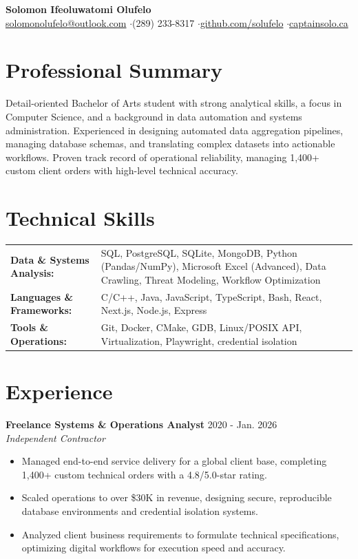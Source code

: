 \documentclass[a4paper,10pt]{article}
\begin{document}
\begin{center}
    {\LARGE \textbf{Solomon Ifeoluwatomi Olufelo}} \\[2pt]
    \href{mailto:solomonolufelo@outlook.com}{solomonolufelo@outlook.com} \enspace$\cdot$\enspace (289) 233-8317 \enspace$\cdot$\enspace \href{https://github.com/solufelo}{github.com/solufelo} \enspace$\cdot$\enspace \href{https://captainsolo.ca}{captainsolo.ca}
\end{center}

\section*{Professional Summary}
Detail-oriented Bachelor of Arts student with strong analytical skills, a focus in Computer Science, and a background in data automation and systems administration. Experienced in designing automated data aggregation pipelines, managing database schemas, and translating complex datasets into actionable workflows. Proven track record of operational reliability, managing 1,400+ custom client orders with high-level technical accuracy.

\section*{Technical Skills}
\begin{tabularx}{\textwidth}{@{}lX@{}}
\textbf{Data \& Systems Analysis:} & SQL, PostgreSQL, SQLite, MongoDB, Python (Pandas/NumPy), Microsoft Excel (Advanced), Data Crawling, Threat Modeling, Workflow Optimization \\
\textbf{Languages \& Frameworks:} & C/C++, Java, JavaScript, TypeScript, Bash, React, Next.js, Node.js, Express \\
\textbf{Tools \& Operations:} & Git, Docker, CMake, GDB, Linux/POSIX API, Virtualization, Playwright, credential isolation \\
\end{tabularx}

\section*{Experience}
\textbf{Freelance Systems \& Operations Analyst} \hfill 2020 - Jan. 2026 \\
\textit{Independent Contractor}
\begin{itemize}
    \item Managed end-to-end service delivery for a global client base, completing 1,400+ custom technical orders with a 4.8/5.0-star rating.
    \item Scaled operations to over \$30K in revenue, designing secure, reproducible database environments and credential isolation systems.
    \item Analyzed client business requirements to formulate technical specifications, optimizing digital workflows for execution speed and accuracy.
\end{itemize}
\end{document}
